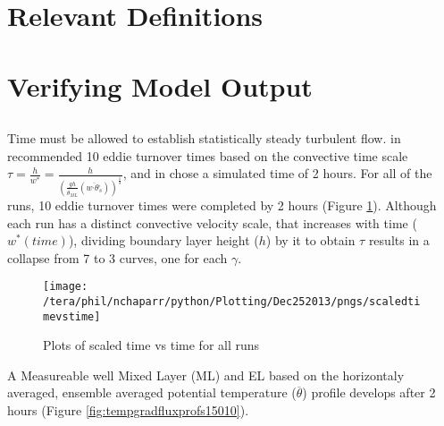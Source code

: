 \section{Relevant Definitions}


\section{Verifying Model Output}
\label{sec:CheckingtheModel}
\subsection{}%
\FloatBarrier

Time must be allowed to establish statistically steady turbulent flow.  \citeauthor{SullMoengStev} in \cite{SullMoengStev}
recommended 10 eddie turnover times based on the convective time scale $\tau = \frac{h}{w^{*}} = \frac{h}{ \left( \frac{gh}{\overline{\theta}_{ML}}(\overline{w^{,} \theta^{,}_{s}}) \right)^{\frac{1}{3}} } $, 
and \citeauthor{BrooksFowler2} in \cite{BrooksFowler2} chose a simulated time of 2 hours.  For all of the runs, 10 eddie 
turnover times were completed by 2 hours (Figure \ref{fig:ScaledTimevsTime}).  Although each run has a distinct
convective velocity scale, that increases with time ($w^{*}(time)$), dividing boundary layer height ($h$) by it
to obtain $\tau$ results in a collapse from 7 to 3 curves, one for each $\gamma$.\\


\begin{figure}[!h]
    \centering
    \texttt{[image: /tera/phil/nchaparr/python/Plotting/Dec252013/pngs/scaledtimevstime]}
    \caption{Plots of scaled time vs time for all runs}
    \label{fig:ScaledTimevsTime}   
\end{figure}

A Measureable well Mixed Layer (\acs{ML}) and \acs{EL} based on the horizontaly averaged, ensemble averaged
potential temperature ($\overline{\theta}$) profile develops after 2 hours (Figure \ref{fig:tempgradfluxprofs15010}).\\

